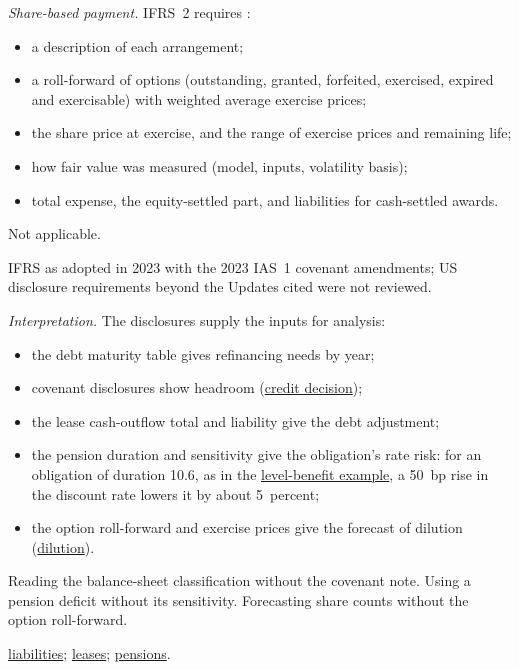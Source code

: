 \begin{qfdefinition}
\emph{Share-based payment.} IFRS~2 requires \citep[IFRS~2 paras.~44--47 and~50--51]{eu-2023-1803-ifrs2}:
\begin{itemize}
\item a description of each arrangement;
\item a roll-forward of options (outstanding, granted, forfeited, exercised, expired and exercisable) with weighted average exercise prices;
\item the share price at exercise, and the range of exercise prices and remaining life;
\item how fair value was measured (model, inputs, volatility basis);
\item total expense, the equity-settled part, and liabilities for cash-settled awards.
\end{itemize}

 Not applicable.

 IFRS as adopted in 2023 with the 2023 IAS~1 covenant amendments; US disclosure requirements beyond the Updates cited were not reviewed.

 \emph{Interpretation.} The disclosures supply the inputs for analysis:
\begin{itemize}
\item the debt maturity table gives refinancing needs by year;
\item covenant disclosures show headroom (\hyperref[ex:integrated-credit-decision]{credit decision});
\item the lease cash-outflow total and liability give the debt adjustment;
\item the pension duration and sensitivity give the obligation's rate risk: for an obligation of duration 10.6, as in the \hyperref[meth:post-employment-benefit-modelling]{level-benefit example}, a 50~bp rise in the discount rate lowers it by about 5~percent;
\item the option roll-forward and exercise prices give the forecast of dilution (\hyperref[meth:share-based-compensation-modelling]{dilution}).
\end{itemize}

 Reading the balance-sheet classification without the covenant note. Using a pension deficit without its sensitivity. Forecasting share counts without the option roll-forward.

 \hyperref[meth:financial-instruments-liabilities]{liabilities}; \hyperref[meth:lease-reporting]{leases}; \hyperref[meth:post-employment-benefit-reporting]{pensions}.

\end{qfdefinition}

